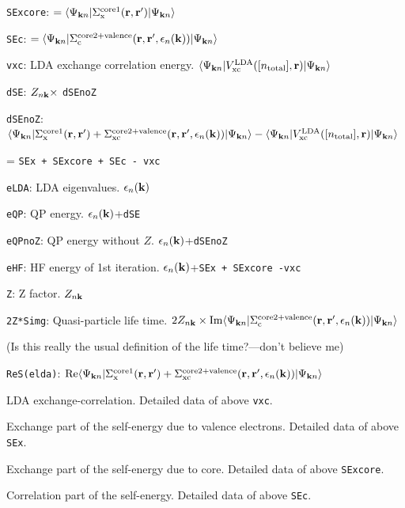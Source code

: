 {{\tt SExcore}: $= \langle\Psi_{{\bf k}n}|\Sigma_{\rm x}^{\rm core1}({\bf r},{\bf r}^{\prime})|\Psi_{{\bf k}n}\rangle$

{\tt SEc}: $ = \langle\Psi_{{\bf k}n}|\Sigma_{\rm c}^{\rm core2+valence}({\bf r},{\bf r}^{\prime},\epsilon_n({\bf k}))|\Psi_{{\bf k}n}\rangle$

{\tt vxc}: LDA exchange correlation energy.
$\langle\Psi_{{\bf k}n}|V_{\rm xc}^{\rm LDA}([n_{\rm total}],{\bf r})|\Psi_{{\bf k}n}\rangle$

{\tt dSE}: $Z_{n{\bf k}}\times$ {\tt dSEnoZ}

{\tt dSEnoZ}: $
\langle\Psi_{{\bf k}n}|
\Sigma_{\rm x}^{\rm core1}({\bf r},{\bf r}^{\prime})+
\Sigma_{\rm xc}^{\rm core2+valence}({\bf r},{\bf r}^{\prime},\epsilon_n({\bf k}))
|\Psi_{{\bf k}n}\rangle 
- \langle\Psi_{{\bf k}n}|V_{\rm xc}^{\rm LDA}([n_{\rm total}],{\bf r})|\Psi_{{\bf k}n}\rangle$

\hspace{1cm} = {\tt SEx + SExcore + SEc - vxc}

{\tt eLDA}: LDA eigenvalues. $\epsilon_n({\bf k})$

{\tt eQP}: QP energy.  $\epsilon_n({\bf k})$+{\tt dSE}

{\tt eQPnoZ}: QP energy without $Z$. $\epsilon_n({\bf k})$+{\tt dSEnoZ}

{\tt eHF}: HF energy of 1st iteration. $\epsilon_n({\bf k})$+{\tt SEx + SExcore -vxc}

{\tt Z}: Z factor. $Z_{n{\bf k}}$

{\tt 2Z*Simg}: Quasi-particle life time. 
$2 Z_{n{\bf k}} \times {\rm Im}
\langle\Psi_{{\bf k}n}|
\Sigma_{\rm c}^{\rm core2+valence}({\bf r},{\bf r}^{\prime},\epsilon_n({\bf k}))
|\Psi_{{\bf k}n}\rangle$ 

(Is this really the usual definition of the life time?---don't believe me)

{\tt ReS(elda)}:
${\rm Re}
\langle\Psi_{{\bf k}n}|
\Sigma_{\rm x}^{\rm core1}({\bf r},{\bf r}^{\prime})+
\Sigma_{\rm xc}^{\rm core2+valence}({\bf r},{\bf r}^{\prime},\epsilon_n({\bf k}))
|\Psi_{{\bf k}n}\rangle$ 


LDA exchange-correlation. 
Detailed data of above {\tt vxc}.

Exchange part of the self-energy due to valence electrons.
Detailed data of above {\tt SEx}.


Exchange part of the self-energy due to core.
Detailed data of above {\tt SExcore}.

Correlation part of the self-energy.
Detailed data of above {\tt SEc}.


}
